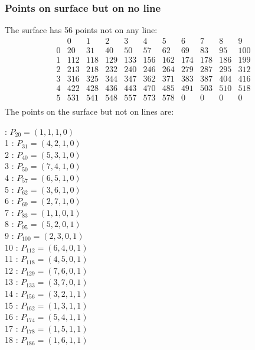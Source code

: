 \documentclass{article}
\begin{document}
{\subsubsection*{Points on surface but on no line}
The surface has 56 points not on any line:\\
$$
\begin{array}{r|*{10}{r}}
 & 0 & 1 & 2 & 3 & 4 & 5 & 6 & 7 & 8 & 9\\
\hline
0 & 20 & 31 & 40 & 50 & 57 & 62 & 69 & 83 & 95 & 100\\
1 & 112 & 118 & 129 & 133 & 156 & 162 & 174 & 178 & 186 & 199\\
2 & 213 & 218 & 232 & 240 & 246 & 264 & 279 & 287 & 295 & 312\\
3 & 316 & 325 & 344 & 347 & 362 & 371 & 383 & 387 & 404 & 416\\
4 & 422 & 428 & 436 & 443 & 470 & 485 & 491 & 503 & 510 & 518\\
5 & 531 & 541 & 548 & 557 & 573 & 578 & 0 & 0 & 0 & 0\\
\end{array}
$$
The points on the surface but not on lines are:\\
\begin{multicols}{2}
 : $P_{20}=( 1, 1, 1, 0 )$\\
1 : $P_{31}=( 4, 2, 1, 0 )$\\
2 : $P_{40}=( 5, 3, 1, 0 )$\\
3 : $P_{50}=( 7, 4, 1, 0 )$\\
4 : $P_{57}=( 6, 5, 1, 0 )$\\
5 : $P_{62}=( 3, 6, 1, 0 )$\\
6 : $P_{69}=( 2, 7, 1, 0 )$\\
7 : $P_{83}=( 1, 1, 0, 1 )$\\
8 : $P_{95}=( 5, 2, 0, 1 )$\\
9 : $P_{100}=( 2, 3, 0, 1 )$\\
10 : $P_{112}=( 6, 4, 0, 1 )$\\
11 : $P_{118}=( 4, 5, 0, 1 )$\\
12 : $P_{129}=( 7, 6, 0, 1 )$\\
13 : $P_{133}=( 3, 7, 0, 1 )$\\
14 : $P_{156}=( 3, 2, 1, 1 )$\\
15 : $P_{162}=( 1, 3, 1, 1 )$\\
16 : $P_{174}=( 5, 4, 1, 1 )$\\
17 : $P_{178}=( 1, 5, 1, 1 )$\\
18 : $P_{186}=( 1, 6, 1, 1 )$\\

\end{multicols}}
\end{document}
